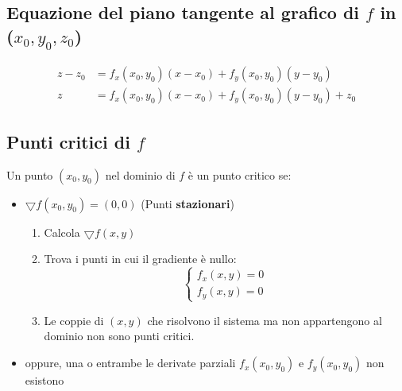 \documentclass[10pt, a4paper]{article}
\begin{document}
    \subsection{Equazione del piano tangente al grafico di $f$ in ($x_0,y_0,z_0$)}
        \begin{equation*}
            \begin{split}
                z-z_0&=f_x(x_0,y_0)(x-x_0)+f_y(x_0,y_0)(y-y_0)\\
                z&=f_x(x_0,y_0)(x-x_0)+f_y(x_0,y_0)(y-y_0)+z_0
            \end{split}
        \end{equation*}
    \subsection{Punti critici di $f$}
        Un punto $(x_0,y_0)$ nel dominio di $f$ è un punto critico se:
        \begin{itemize}
            \item $\bigtriangledown f(x_0,y_0)=(0,0)$ (Punti \textbf{stazionari}) \begin{enumerate}
                \item Calcola $\bigtriangledown f(x,y)$
                \item Trova i punti in cui il gradiente è nullo: \begin{equation*}
                    \begin{cases}
                        f_x(x,y)=0\\
                        f_y(x,y)=0
                    \end{cases}
                \end{equation*}
                \item Le coppie di $(x,y)$ che risolvono il sistema ma non appartengono al dominio non sono punti critici.
            \end{enumerate}
            \item oppure, una o entrambe le derivate parziali $f_x(x_0,y_0)$ e $f_y(x_0,y_0)$ non esistono
        \end{itemize}
\end{document}

